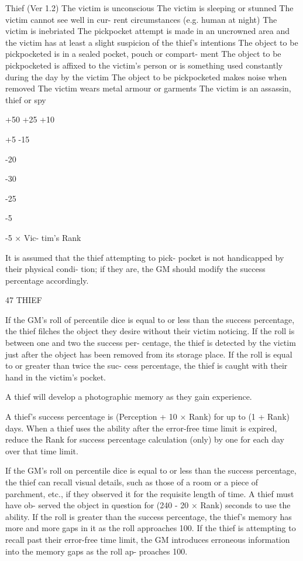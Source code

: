 \begin{Chapter}{Thief (Ver 1.2)}
The victim is unconscious 
The victim is sleeping or stunned 
The victim cannot see well in cur-
rent circumstances (e.g. human at 
night) 
The victim is inebriated 
The pickpocket attempt is made in 
an uncrowned area and the victim 
has at least a slight suspicion of the 
thief’s intentions 
The object to be pickpocketed is in a 
sealed pocket, pouch or compart-
ment 
The object to be pickpocketed is 
affixed to the victim’s person or is 
something used constantly during 
the day by the victim 
The object to be pickpocketed 
makes noise when removed 
The victim wears metal armour or 
garments 
The victim is an assassin, thief or 
spy 

+50%
+25%
+10%

+5%
-15%

-20%

-30%

-25%

-5%

-5 × Vic-
tim’s 
Rank%

It  is  assumed  that  the  thief  attempting  to  pick-
pocket is not handicapped by their physical condi-
tion; if they are, the GM should modify the success 
percentage accordingly. 

47 THIEF 

If  the  GM’s  roll  of  percentile  dice  is  equal  to  or 
less  than  the  success  percentage,  the  thief  filches 
the object they desire without their victim noticing. 
If the roll is between one and two the success per-
centage, the thief is detected by the victim just after 
the object has been removed from its storage place. 
If the roll is equal to or greater than twice the suc-
cess percentage, the thief is caught with their hand 
in the victim’s pocket. 

A  thief  will  develop  a  photographic  memory  as 
they gain experience. 

A thief’s success percentage is (Perception + 10 × 
Rank)%
for  up  to  (1  +  Rank)  days.  When  a  thief  uses  the 
ability  after  the  error-free  time  limit  is  expired, 
reduce the Rank for success percentage calculation 
(only) by one for each day over that time limit. 

If  the  GM’s  roll  on  percentile  dice  is  equal  to  or 
less  than  the  success  percentage,  the  thief  can 
recall  visual  details,  such  as  those  of  a  room  or  a 
piece of parchment, etc., if they observed it for the 
requisite  length  of  time.  A  thief  must  have  ob-
served the object in question for (240 - 20 × Rank) 
seconds to use the ability. If the roll is greater than 
the  success  percentage,  the  thief’s  memory  has 
more  and  more  gaps  in  it  as  the  roll  approaches 
100.  If  the  thief  is  attempting  to  recall  past  their 
error-free time limit, the GM introduces erroneous 
information  into  the  memory  gaps  as  the  roll  ap-
proaches 100. 


\end{Chapter}
